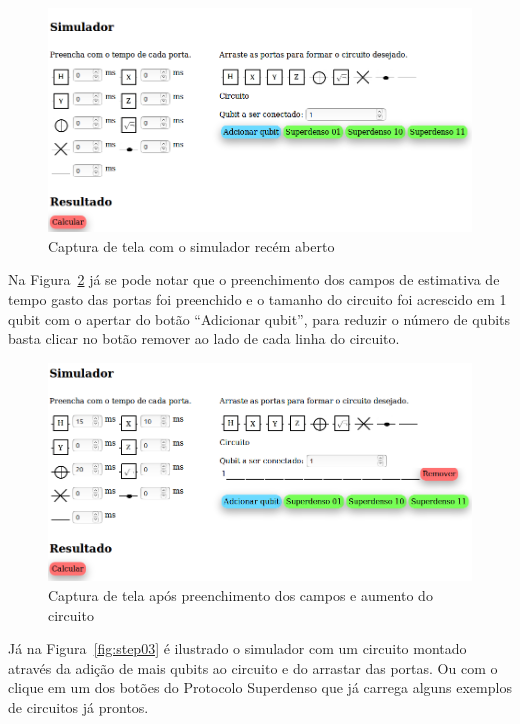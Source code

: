\documentclass[a4paper, 12pt, oneside]{book}
\begin{document}
\begin{figure}[H]
\centering
\includegraphics[scale=0.45]{step01.png}
\caption{Captura de tela com o simulador recém aberto}
\label{fig:step01}
\end{figure}

Na Figura~\ref{fig:step02} já se pode notar que o preenchimento dos campos de estimativa de tempo gasto das portas foi preenchido e o tamanho do circuito foi acrescido em 1 qubit com o apertar do botão ``Adicionar qubit'', para reduzir o número de qubits basta clicar no botão remover ao lado de cada linha do circuito.

\begin{figure}[H]
\centering
\includegraphics[scale=0.45]{step02.png}
\caption{Captura de tela após preenchimento dos campos e aumento do circuito}
\label{fig:step02}
\end{figure}

Já na Figura~\ref{fig:step03} é ilustrado o simulador com um circuito montado através da adição de mais qubits ao circuito e do arrastar das portas. Ou com o clique em um dos botões do Protocolo Superdenso que já carrega alguns exemplos de circuitos já prontos.
\end{document}
